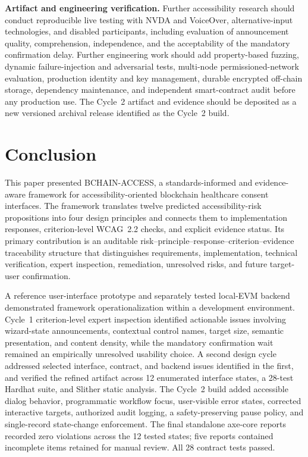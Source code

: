 \documentclass[journal]{IEEEtran}
\begin{document}
\noindent\textbf{Artifact and engineering verification.}
Further accessibility research should conduct reproducible live testing with NVDA and VoiceOver, alternative-input technologies, and disabled participants, including evaluation of announcement quality, comprehension, independence, and the acceptability of the mandatory confirmation delay. Further engineering work should add property-based fuzzing, dynamic failure-injection and adversarial tests, multi-node permissioned-network evaluation, production identity and key management, durable encrypted off-chain storage, dependency maintenance, and independent smart-contract audit before any production use. The Cycle~2 artifact and evidence should be deposited as a new versioned archival release identified as the Cycle~2 build.

\section{Conclusion}
\label{sec:conclusion}

This paper presented BCHAIN-ACCESS, a standards-informed and evidence-aware framework for accessibility-oriented blockchain healthcare consent interfaces. The framework translates twelve predicted accessibility-risk propositions into four design principles and connects them to implementation responses, criterion-level WCAG~2.2 checks, and explicit evidence status. Its primary contribution is an auditable risk--principle--response--criterion--evidence traceability structure that distinguishes requirements, implementation, technical verification, expert inspection, remediation, unresolved risks, and future target-user confirmation.

A reference user-interface prototype and separately tested local-EVM backend demonstrated framework operationalization within a development environment. Cycle~1 criterion-level expert inspection identified actionable issues involving wizard-state announcements, contextual control names, target size, semantic presentation, and content density, while the mandatory confirmation wait remained an empirically unresolved usability choice. A second design cycle addressed selected interface, contract, and backend issues identified in the first, and verified the refined artifact across 12 enumerated interface states, a 28-test Hardhat suite, and Slither static analysis. The Cycle~2 build added accessible dialog behavior, programmatic workflow focus, user-visible error states, corrected interactive targets, authorized audit logging, a safety-preserving pause policy, and single-record state-change enforcement. The final standalone axe-core reports recorded zero violations across the 12 tested states; five reports contained incomplete items retained for manual review. All 28 contract tests passed.
\end{document}
